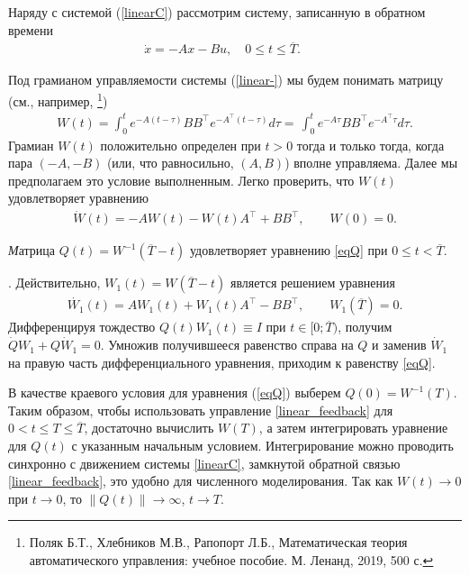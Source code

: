 \documentclass[../main.tex]{subfiles}
\begin{document}
	Наряду с системой (\ref{linearC}) рассмотрим систему, записанную в обратном времени
	\begin{gather}\label{linear-}
		\dot{x} =  -A  x - B u, \quad 0 \leqslant t \leqslant \overline{T}. \qquad 
	\end{gather}
	
	 Под грамианом управляемости  системы (\ref{linear-}) мы будем понимать   матрицу (см., например, \footnote{Поляк Б.Т., Хлебников М.В., Рапопорт Л.Б., Математическая теория автоматического управления: учебное пособие. М. Ленанд, 2019, 500 с.})
	\begin{gather}\label{gram_Stationary}
		W(t) = \int_0^t e^{-A(t-\tau)}BB^\top e^{-A^{\top}(t-\tau)} d\tau=\,\int_0^t e^{-A\tau}BB^\top e^{-A^\top{\tau}}d\tau.
	\end{gather}
	Грамиан $W(t)$ положительно определен при $t>0$ тогда и только тогда, когда пара $(-A,-B)$ (или, что равносильно, $(A,B)$) вполне управляема. Далее мы предполагаем это условие выполненным. Легко проверить, что $W(t)$ удовлетворяет уравнению
	\begin{gather*}
		\dot{W}(t) = -A W(t)-W(t) A^\top +B B^\top,  \qquad W(0) = 0.
	\end{gather*}
	\begin{utv}
	{\textit Матрица $Q(t)=W^{-1}(\overline{T}-t)$ удовлетворяет уравнению {\rm \ref{eqQ}}} при $0 \leqslant t < \overline{T} $.
	\end{utv}
	\doc. Действительно, $W_1(t)=W(\overline{T}-t)$ является решением уравнения 
	\begin{gather*}
		\dot{W_1}(t) = A W_1(t)+W_1(t) A^\top -B B^\top,  \qquad W_1(\overline{T}) = 0.
	\end{gather*}
	Дифференцируя тождество $Q(t)W_1(t)\equiv I$ при $ t \in [0;\overline{T})$, получим
	$\dot{Q}W_1+Q\dot{W}_1=0 $. Умножив получившееся равенство справа на $Q$
	и заменив $\dot{W}_1$ на правую часть дифференциального уравнения, приходим к равенству 
	\eqref{eqQ}.
	
	В качестве краевого условия для уравнения (\ref{eqQ}) выберем $Q(0)=W^{-1}(T)$. Таким образом, чтобы использовать управление \eqref{linear_feedback} для $0<t \leqslant T \leqslant \overline{T}$, достаточно вычислить $W(T)$, а затем интегрировать уравнение для $Q(t)$  с указанным начальным условием. Интегрирование можно проводить синхронно с движением системы \eqref{linearC}, замкнутой обратной связью \eqref{linear_feedback}, это удобно для численного моделирования. Так как $W(t)\to 0$ при $t\to 0$, то $\|Q(t) \|\to \infty$, $t\to T$.
	
\end{document}
